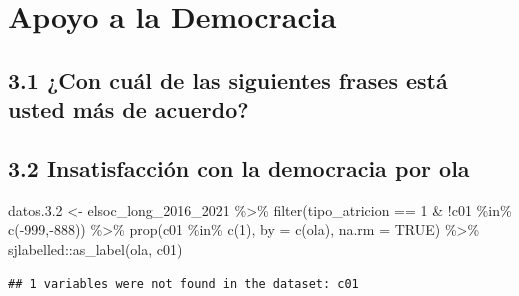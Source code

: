 \documentclass[
  12pt,
]{book}
\newenvironment{Shaded}{\begin{snugshade}}{\end{snugshade}}
\newcommand{\AttributeTok}[1]{\textcolor[rgb]{0.77,0.63,0.00}{#1}}
\newcommand{\ConstantTok}[1]{\textcolor[rgb]{0.00,0.00,0.00}{#1}}
\newcommand{\DecValTok}[1]{\textcolor[rgb]{0.00,0.00,0.81}{#1}}
\newcommand{\FloatTok}[1]{\textcolor[rgb]{0.00,0.00,0.81}{#1}}
\newcommand{\FunctionTok}[1]{\textcolor[rgb]{0.00,0.00,0.00}{#1}}
\newcommand{\NormalTok}[1]{#1}
\newcommand{\OtherTok}[1]{\textcolor[rgb]{0.56,0.35,0.01}{#1}}
\newcommand{\SpecialCharTok}[1]{\textcolor[rgb]{0.00,0.00,0.00}{#1}}
\begin{document}
\hypertarget{apoyo-a-la-democracia}{%
\section{Apoyo a la Democracia}\label{apoyo-a-la-democracia}}

\hypertarget{con-cuuxe1l-de-las-siguientes-frases-estuxe1-usted-muxe1s-de-acuerdo}{%
\subsection{3.1 ¿Con cuál de las siguientes frases está usted más de acuerdo?}\label{con-cuuxe1l-de-las-siguientes-frases-estuxe1-usted-muxe1s-de-acuerdo}}

\hypertarget{insatisfacciuxf3n-con-la-democracia-por-ola}{%
\subsection{3.2 Insatisfacción con la democracia por ola}\label{insatisfacciuxf3n-con-la-democracia-por-ola}}

\begin{Shaded}
\begin{Highlighting}[]
\NormalTok{datos.}\FloatTok{3.2} \OtherTok{\textless{}{-}}\NormalTok{ elsoc\_long\_2016\_2021 }\SpecialCharTok{\%\textgreater{}\%}
  \FunctionTok{filter}\NormalTok{(tipo\_atricion }\SpecialCharTok{==} \DecValTok{1} \SpecialCharTok{\&} \SpecialCharTok{!}\NormalTok{c01 }\SpecialCharTok{\%in\%} \FunctionTok{c}\NormalTok{(}\SpecialCharTok{{-}}\DecValTok{999}\NormalTok{,}\SpecialCharTok{{-}}\DecValTok{888}\NormalTok{)) }\SpecialCharTok{\%\textgreater{}\%}
  \FunctionTok{prop}\NormalTok{(c01 }\SpecialCharTok{\%in\%} \FunctionTok{c}\NormalTok{(}\DecValTok{1}\NormalTok{), }\AttributeTok{by  =} \FunctionTok{c}\NormalTok{(ola), }\AttributeTok{na.rm =} \ConstantTok{TRUE}\NormalTok{) }\SpecialCharTok{\%\textgreater{}\%}
\NormalTok{  sjlabelled}\SpecialCharTok{::}\FunctionTok{as\_label}\NormalTok{(ola, c01)}
\end{Highlighting}
\end{Shaded}

\begin{verbatim}
## 1 variables were not found in the dataset: c01
\end{verbatim}
\end{document}
